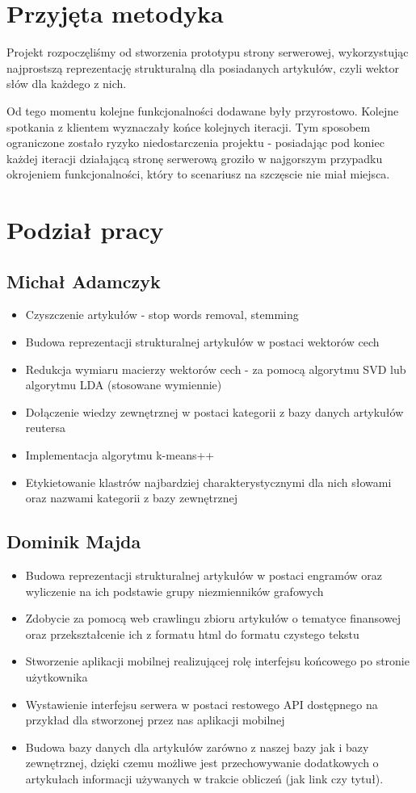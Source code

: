 \section{Przyjęta metodyka}
Projekt rozpoczęliśmy od stworzenia prototypu strony serwerowej,
wykorzystując najprostszą reprezentację strukturalną dla posiadanych artykułów, czyli wektor słów dla każdego z nich.

Od tego momentu kolejne funkcjonalności dodawane były przyrostowo. Kolejne spotkania z klientem wyznaczały końce kolejnych iteracji. Tym sposobem ograniczone zostało ryzyko niedostarczenia projektu - posiadając pod koniec każdej iteracji działającą stronę serwerową groziło w najgorszym przypadku okrojeniem funkcjonalności, który to scenariusz na szczęscie nie miał miejsca.

\section{Podział pracy}
\subsection{Michał Adamczyk}
\begin{itemize}
  \item Czyszczenie artykułów - stop words removal, stemming
  \item Budowa reprezentacji strukturalnej artykułów w postaci wektorów cech
  \item Redukcja wymiaru macierzy wektorów cech - za pomocą algorytmu SVD lub algorytmu LDA (stosowane wymiennie)
  \item Dołączenie wiedzy zewnętrznej w postaci kategorii z bazy danych artykułów reutersa
  \item Implementacja algorytmu k-means++
  \item Etykietowanie klastrów najbardziej charakterystycznymi dla nich słowami oraz nazwami kategorii z bazy zewnętrznej
\end{itemize}
\subsection{Dominik Majda}
\begin{itemize}
  \item Budowa reprezentacji strukturalnej artykułów w postaci engramów oraz wyliczenie na ich podstawie grupy niezmienników grafowych
  \item Zdobycie za pomocą web crawlingu zbioru artykułów o tematyce finansowej oraz przekształcenie ich z formatu html do formatu czystego tekstu
  \item Stworzenie aplikacji mobilnej realizującej rolę interfejsu końcowego po stronie użytkownika
  \item Wystawienie interfejsu serwera w postaci restowego API dostępnego na przykład dla stworzonej przez nas aplikacji mobilnej 
 \item Budowa bazy danych dla artykułów zarówno z naszej bazy jak i bazy zewnętrznej, dzięki czemu możliwe jest przechowywanie dodatkowych o artykułach informacji używanych w trakcie obliczeń (jak link czy tytuł).  
\end{itemize}